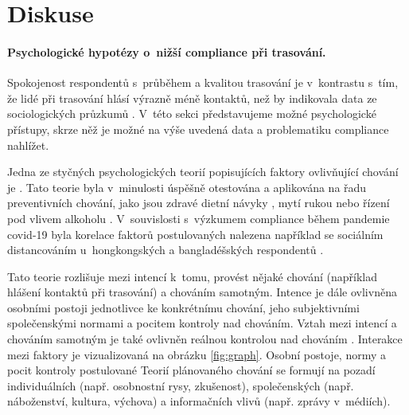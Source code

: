 \section*{Diskuse}
\paragraph*{Psychologické hypotézy o~nižší compliance při trasování.}
Spokojenost res\-pon\-den\-tů  s~průběhem a kvalitou trasování je v~kontrastu s~tím, že lidé při trasování hlásí výrazně méně kontaktů, než by indikovala data ze sociologických průzkumů \cite{Prokop2020a}. V~této sekci představujeme možné psychologické přístupy, skrze něž je možné na výše uvedená data a problematiku compliance nahlížet.  

Jedna ze styčných psychologických teorií popisujících faktory ovlivňující chování je  \cite{Ajzen1985}. Tato teorie byla v~minulosti úspěšně otestována a aplikována na řadu preventivních chování, jako jsou zdravé dietní návyky \cite{Hackman2014}, mytí rukou \cite{Hackman2014} nebo řízení pod vlivem alkoholu \cite{Moan2011}. V~souvislosti s~výzkumem compliance během pandemie covid-19 byla korelace faktorů postulovaných  nalezena například se sociálním distancováním u~hongkongských \cite{Yu2021} a bangladéšských respondentů \cite{Das2021}. 

Tato teorie rozlišuje mezi intencí k~tomu, provést nějaké chování (například hlášení kontaktů při trasování) a chováním samotným. Intence je dále ovlivněna osobními postoji jednotlivce ke konkrétnímu chování, jeho subjektivními spo\-le\-čen\-ský\-mi normami a pocitem kontroly nad chováním. 
Vztah mezi intencí a chováním samotným je také ovlivněn reálnou kontrolou nad chováním \cite{Ajzen1985}. Interakce mezi faktory je vizualizovaná na obrázku \ref{fig:graph}. Osobní postoje, normy a pocit kontroly postulované Teorií plánovaného chování se formují na pozadí individuálních (např. osobnostní rysy, zkušenost), společenských (např. náboženství, kultura, vý\-cho\-va) a informačních vlivů (např. zprávy v~médiích). 

